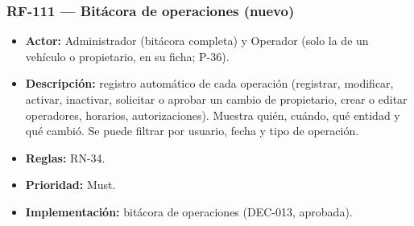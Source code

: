 \subsubsection{RF-111 — Bitácora de operaciones (nuevo)}
\begin{itemize}
  \item \textbf{Actor:} Administrador (bitácora completa) y Operador (solo la de un vehículo o propietario, en su ficha; P-36).
  \item \textbf{Descripción:} registro automático de cada operación (registrar, modificar, activar, inactivar, solicitar o aprobar un cambio de propietario, crear o editar operadores, horarios, autorizaciones). Muestra quién, cuándo, qué entidad y qué cambió. Se puede filtrar por usuario, fecha y tipo de operación.
  \item \textbf{Reglas:} RN-34.
  \item \textbf{Prioridad:} Must.
  \item \textbf{Implementación:} bitácora de operaciones (DEC-013, aprobada).
\end{itemize}


